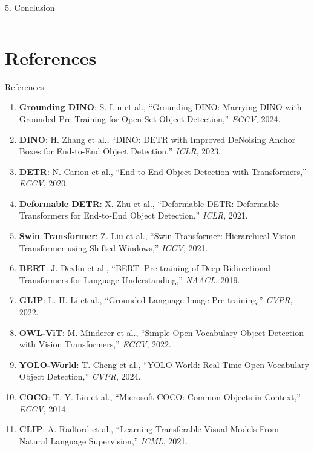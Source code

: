 \documentclass[aspectratio=169,10pt]{beamer}
\begin{document}
\begin{frame}{5. Conclusion}
\begin{columns}[T]
  \end{columns}
\end{frame}

\section{References}

\begin{frame}{References}
  \footnotesize
  \renewcommand{\arraystretch}{1.4}
  \begin{enumerate}\setlength{\itemsep}{2pt}
    \item \textbf{Grounding DINO}: S. Liu et al., ``Grounding DINO: Marrying DINO with Grounded Pre-Training for Open-Set Object Detection,'' \textit{ECCV}, 2024.
    \item \textbf{DINO}: H. Zhang et al., ``DINO: DETR with Improved DeNoising Anchor Boxes for End-to-End Object Detection,'' \textit{ICLR}, 2023.
    \item \textbf{DETR}: N. Carion et al., ``End-to-End Object Detection with Transformers,'' \textit{ECCV}, 2020.
    \item \textbf{Deformable DETR}: X. Zhu et al., ``Deformable DETR: Deformable Transformers for End-to-End Object Detection,'' \textit{ICLR}, 2021.
    \item \textbf{Swin Transformer}: Z. Liu et al., ``Swin Transformer: Hierarchical Vision Transformer using Shifted Windows,'' \textit{ICCV}, 2021.
    \item \textbf{BERT}: J. Devlin et al., ``BERT: Pre-training of Deep Bidirectional Transformers for Language Understanding,'' \textit{NAACL}, 2019.
    \item \textbf{GLIP}: L. H. Li et al., ``Grounded Language-Image Pre-training,'' \textit{CVPR}, 2022.
    \item \textbf{OWL-ViT}: M. Minderer et al., ``Simple Open-Vocabulary Object Detection with Vision Transformers,'' \textit{ECCV}, 2022.
    \item \textbf{YOLO-World}: T. Cheng et al., ``YOLO-World: Real-Time Open-Vocabulary Object Detection,'' \textit{CVPR}, 2024.
    \item \textbf{COCO}: T.-Y. Lin et al., ``Microsoft COCO: Common Objects in Context,'' \textit{ECCV}, 2014.
    \item \textbf{CLIP}: A. Radford et al., ``Learning Transferable Visual Models From Natural Language Supervision,'' \textit{ICML}, 2021.
  \end{enumerate}
\end{frame}
\end{document}
